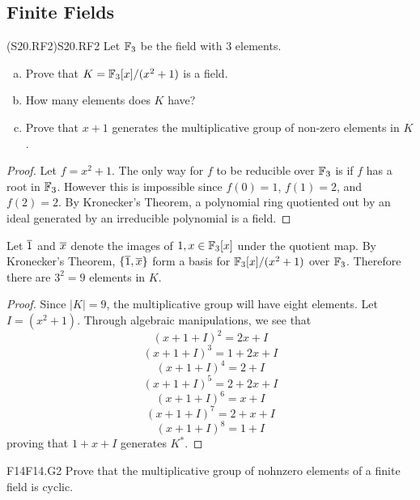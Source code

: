 \documentclass[../AlgebraQualSolutions.tex]{subfiles}
\begin{document}
\subsection{Finite Fields}

\begin{prob}{(S20.RF2)}{S20.RF2}
Let $\mathbb{F}_3$ be the field with 3 elements.
\begin{enumerate}[(a)]
\item Prove that $K = \mathbb{F}_3[x]/(x^2 + 1)$ is a field.
\item How many elements does $K$ have?
\item Prove that $x+1$ generates the multiplicative group of non-zero elements in $K$.
\end{enumerate}
\end{prob}

\begin{proof}
	Let $f = x^2 + 1$. The only way for $f$ to be reducible over $\mathbb{F}_3$ is if $f$ has a root in $\mathbb{F}_3$. However this is impossible since $f(0) = 1$, $f(1) = 2$, and $f(2) = 2$. By Kronecker's Theorem, a polynomial ring quotiented out by an ideal generated by an irreducible polynomial is a field.
\end{proof}

\begin{solution}
	Let $\overline{1}$ and $\overline{x}$ denote the images of $1,x \in \mathbb{F}_3[x]$ under the quotient map. By Kronecker's Theorem, $\{\overline{1},\overline{x}\}$ form a basis for $\mathbb{F}_3[x]/(x^2 + 1)$ over $\mathbb{F}_3$. Therefore there are $3^2 = 9$ elements in $K$.
\end{solution}

\begin{proof}
	Since $|K| = 9$, the multiplicative group will have eight elements. Let $I = (x^2 + 1)$. Through algebraic manipulations, we see that 
		\[(x+1+I)^2 = 2x + I\]
		\[(x+1+I)^3 = 1 + 2x + I\]
		\[(x+1+I)^4 = 2 + I\]
		\[(x+1+I)^5 = 2 + 2x + I\]
		\[(x+1+I)^6 = x + I\]
		\[(x+1+I)^7 = 2 + x + I\]
		\[(x+1+I)^8 = 1 + I\]
	proving that $1 + x + I$ generates $K^*$.
\end{proof}

\begin{prob}{F14}{F14.G2}
	Prove that the multiplicative group of nohnzero elements of a finite field is cyclic.
\end{prob}
\end{document}
